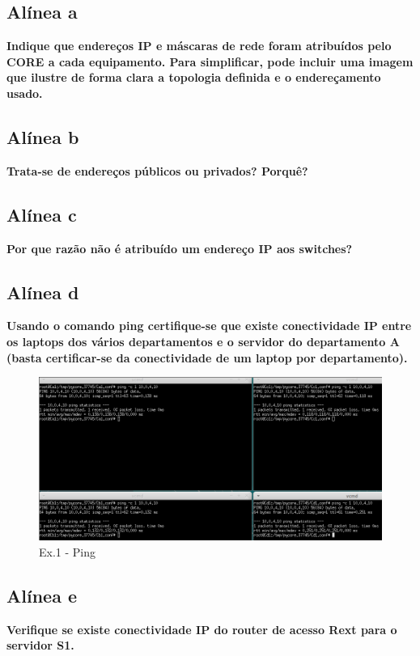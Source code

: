 \documentclass[a4paper]{report}
\begin{document}
\subsection{Alínea a}
\textbf{Indique que endereços IP e máscaras de rede foram atribuídos pelo CORE a cada
equipamento. Para simplificar, pode incluir uma imagem que ilustre de forma clara a
topologia definida e o endereçamento usado.}

\subsection{Alínea b}
\textbf{Trata-se de endereços públicos ou privados? Porquê?}

\subsection{Alínea c}
\textbf{Por que razão não é atribuído um endereço IP aos switches?}

\subsection{Alínea d}
\textbf{Usando o comando ping certifique-se que existe conectividade IP entre 
os laptops dos vários departamentos e o servidor do departamento A 
(basta certificar-se da conectividade de um laptop por departamento).}

\begin{figure}[H]
    \centering 
    \includegraphics[width=\textwidth]{images/pingEx1P2.png}
    \caption{Ex.1 - Ping}
    \label{fig:pingEx1P2}
\end{figure}

\subsection{Alínea e}
\textbf{Verifique se existe conectividade IP do router de acesso Rext para o servidor S1.}
\end{document}
